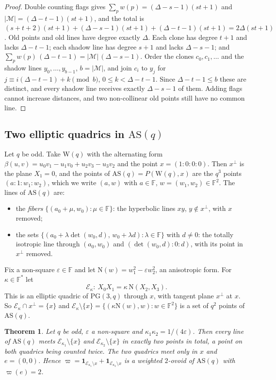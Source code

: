 \documentclass[11pt]{amsart}
\newtheorem{theorem}{Theorem}[section]
\theoremstyle{definition}
\theoremstyle{remark}
\newcommand{\cE}{\mathcal{E}}
\newcommand{\cM}{\mathcal{M}}
\newcommand{\PG}{\mathrm{PG}}
\newcommand{\F}{\mathbb{F}}
\newcommand{\AS}{\mathrm{AS}}
\newcommand{\Wq}{\mathrm{W}}
\newcommand{\Nm}{\mathrm{N}}
\begin{document}
\begin{proof}
Double counting flags gives $\sum_pw(p)=(\Delta-s-1)(st+1)$ and $|\cM|=(\Delta-t-1)(st+1)$, and the total is $(s+t+2)(st+1)+(\Delta-s-1)(st+1)+(\Delta-t-1)(st+1)=2\Delta(st+1)$. Old points and old lines have degree exactly $\Delta$. Each clone has degree $t+1$ and lacks $\Delta-t-1$; each shadow line has degree $s+1$ and lacks $\Delta-s-1$; and $\sum_pw(p)\,(\Delta-t-1)=|\cM|\,(\Delta-s-1)$. Order the clones $c_0,c_1,\dots$ and the shadow lines $y_0,\dots,y_{b-1}$, $b=|\cM|$, and join $c_i$ to $y_j$ for $j\equiv i(\Delta-t-1)+k\pmod b$, $0\le k<\Delta-t-1$. Since $\Delta-t-1\le b$ these are distinct, and every shadow line receives exactly $\Delta-s-1$ of them. Adding flags cannot increase distances, and two non-collinear old points still have no common line.
\end{proof}

\subsection{Two elliptic quadrics in \texorpdfstring{$\AS(q)$}{AS(q)}}
Let $q$ be odd. Take $\Wq(q)$ with the alternating form $\beta(u,v)=u_0v_1-u_1v_0+u_2v_3-u_3v_2$ and the point $x=(1{:}0{:}0{:}0)$. Then $x^\perp$ is the plane $X_1=0$, and the points of $\AS(q)=P(\Wq(q),x)$ are the $q^3$ points $(a{:}1{:}w_1{:}w_2)$, which we write $(a,w)$ with $a\in\F$, $w=(w_1,w_2)\in\F^2$. The lines of $\AS(q)$ are:
\begin{itemize}[leftmargin=1.5em]
\item the \emph{fibers} $\{(a_0+\mu,w_0):\mu\in\F\}$: the hyperbolic lines $xy$, $y\notin x^\perp$, with $x$ removed;
\item the sets $\{(a_0+\lambda\det(w_0,d),\,w_0+\lambda d):\lambda\in\F\}$ with $d\ne0$: the totally isotropic line through $(a_0,w_0)$ and $(\det(w_0,d){:}0{:}d)$, with its point in $x^\perp$ removed.
\end{itemize}
Fix a non-square $\varepsilon\in\F$ and let $\Nm(w)=w_1^2-\varepsilon w_2^2$, an anisotropic form. For $\kappa\in\F^*$ let
\[
\cE_\kappa\colon\ X_0X_1=\kappa\,\Nm(X_2,X_3).
\]
This is an elliptic quadric of $\PG(3,q)$ through $x$, with tangent plane $x^\perp$ at $x$. So $\cE_\kappa\cap x^\perp=\{x\}$ and $\cE_\kappa\setminus\{x\}=\{(\kappa\Nm(w),w):w\in\F^2\}$ is a set of $q^2$ points of $\AS(q)$.

\begin{theorem}\label{thm:A}
Let $q$ be odd, $\varepsilon$ a non-square and $\kappa_1\kappa_2=1/(4\varepsilon)$. Then every line of $\AS(q)$ meets $\cE_{\kappa_1}\setminus\{x\}$ and $\cE_{\kappa_2}\setminus\{x\}$ in exactly two points in total, a point on both quadrics being counted twice. The two quadrics meet only in $x$ and $e=(0,0)$. Hence $\varpi=\mathbf 1_{\cE_{\kappa_1}\setminus x}+\mathbf 1_{\cE_{\kappa_2}\setminus x}$ is a weighted $2$-ovoid of $\AS(q)$ with $\varpi(e)=2$.
\end{theorem}
\end{document}
